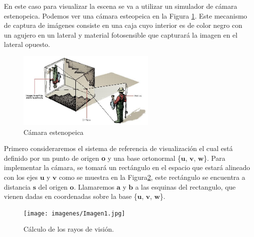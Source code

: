En este caso para visualizar la escena se va a utilizar un simulador de cámara estenopeica. Podemos ver una cámara esteopeica en la Figura \ref{fig:etiq_1}. Este mecanismo de captura de imágenes consiste en una caja cuyo interior es de color negro con un agujero en un lateral y material fotosensible que capturará la imagen en el lateral opuesto.
	${ }$\\	


\begin{figure}
	\begin{center}
		\includegraphics[width=0.6\textwidth]{imagenes/camara-estenopeica.jpg}
	\end{center}
	\caption{Cámara estenopeica}
	\label{fig:etiq_1}
\end{figure}

Primero consideraremos el sistema de referencia de visualización el cual está definido por un punto de origen \textbf{o} y una base ortonormal \{$\textbf{u}$, $\textbf{v}$, $\textbf{w}$\}. Para implementar la cámara, se tomará un rectángulo en el espacio que estará alineado con los ejes $\textbf{u}$ y $\textbf{v}$ como se muestra en la Figura\ref{fig:etiq_3}, este rectángulo se encuentra a distancia $\textbf{s}$ del origen $\textbf{o}$. Llamaremos $\textbf{a}$ y $\textbf{b}$ a las esquinas del rectangulo, que vienen dadas en coordenadas sobre la base \{$\textbf{u}$, $\textbf{v}$, $\textbf{w}$\}.
	${ }$\\

\begin{figure}
	\begin{center}
		\texttt{[image: imagenes/Imagen1.jpg]}
	\end{center}
	\caption{Cálculo de los rayos de visión.}
	\label{fig:etiq_3}
\end{figure}




